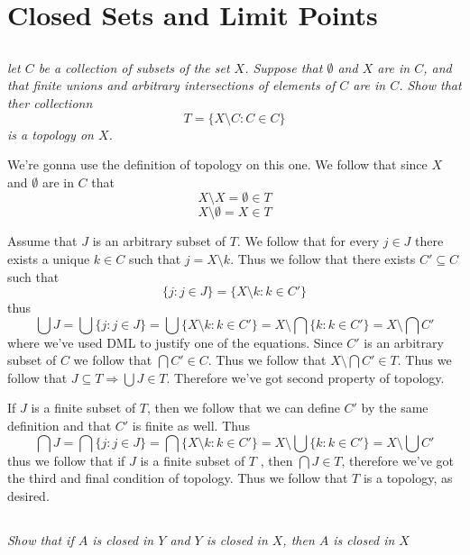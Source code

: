 \documentclass[11pt,oneside,titlepage]{book}
\DeclareMathOperator \ra {\Rightarrow}
\newcommand{\set}[1]{\{ #1 \}}
\begin{document}
\section{Closed Sets and Limit Points}

\subsection{}

\textit{let $C$ be a collection of subsets of the set $X$. Suppose that $\emptyset$ and
  $X$ are in $C$, and that finite unions and arbitrary intersections of elements of $C$
  are in $C$. Show that ther collectionn
  $$T = \set{X \setminus C: C \in C}$$
  is a topology on $X$.}

We're gonna use the definition of topology on this one. We follow that
since $X$ and $\emptyset $ are in $C$ that
$$X \setminus X = \emptyset \in T$$
$$X \setminus \emptyset = X \in T$$

Assume that $J$ is an arbitrary subset of $T$. We follow that
for every $j \in J$ there exists a unique $k \in C$ such that $j = X \setminus k$. Thus we
follow that there exists $C' \subseteq C$ such that 
$$\set{j: j \in J} = \set{X \setminus k: k \in C'}$$
thus
$$\bigcup{J} = \bigcup{\set{j: j \in J}} = \bigcup{\set{X \setminus k: k \in C'}} =
X \setminus \bigcap{\set{k: k \in C'}} = X \setminus \bigcap{C'}$$
where we've used DML to justify one of the equations.
Since $C'$ is an arbitrary subset of $C$ we follow that $\bigcap{C'} \in C$. Thus we follow that
$X \setminus \bigcap C' \in T$. Thus we follow that
$J \subseteq T \ra \bigcup{J} \in T$. Therefore we've got second property of topology.

If $J$ is a finite subset of $T$, then we follow that
we can define $C'$ by the same definition and that $C'$ is finite as well. Thus 
$$\bigcap{J} = \bigcap{\set{j: j \in J}} = \bigcap{\set{X \setminus k: k \in C'}} =
X \setminus \bigcup{\set{k: k \in C'}} = X \setminus \bigcup{C'}$$
thus we follow that if $J$ is a finite subset of $T$ , then $\bigcap{J} \in T$, therefore
we've got the third and final condition of topology. Thus we follow that $T$ is a
topology,  as desired.


\subsection{}

\textit{Show that if $A$ is closed in $Y$ and $Y$ is closed in $X$, then $A$ is closed in $X$}
\end{document}
